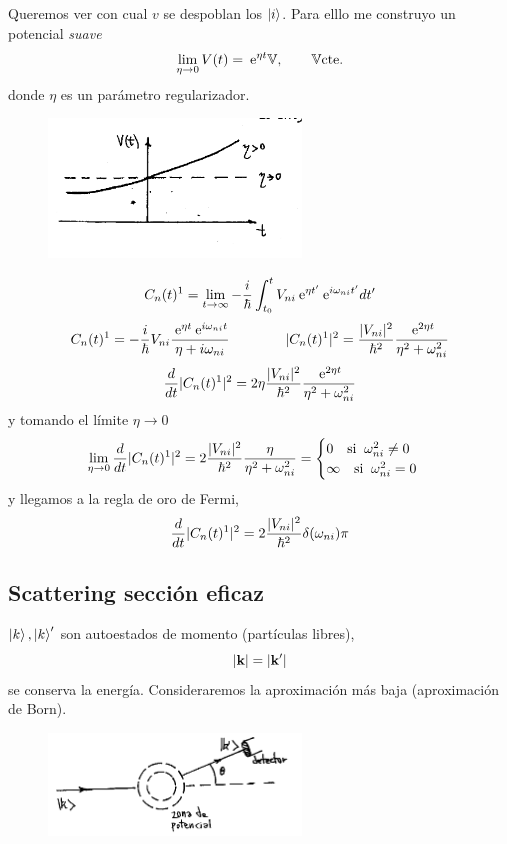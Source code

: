 \documentclass[10pt,oneside]{CBFT_book}
\begin{document}
Queremos ver con cual $v$ se despoblan los $\Ket{i}$. Para elllo me construyo un potencial {\it suave}
\[
	\lim_{\eta\to 0} V(t) = \:\mathrm{e}^{\eta t} \mathbb{V}, \qquad  \mathbb{V} \text{cte.}
\]
donde $\eta$ es un parámetro regularizador.
\begin{figure}[htb]
	\begin{center}
	\includegraphics[width=0.6\textwidth]{images/teo2_27.pdf}
	\end{center}
	\caption{}
\end{figure} 
\[
	C_n(t)^1 = \lim_{t\to\infty} -\frac{i}{\hbar} 
		\int_{t_0}^t V_{ni} \:\mathrm{e}^{\eta t'} \:\mathrm{e}^{i\omega_{ni} t'} dt'
\]
\[
	C_n(t)^1 = -\frac{i}{\hbar} V_{ni} \frac{\:\mathrm{e}^{\eta t} \:\mathrm{e}^{i\omega_{ni} t} }{\eta+i\omega_{ni}}
	\qquad \qquad 
 	|C_n(t)^1|^2 = \frac{|V_{ni}|^2}{\hbar^2} \frac{\:\mathrm{e}^{2\eta t} }{\eta^2 + \omega_{ni}^2 }
\]
\[
	\frac{d^{\hspace{-0.05em}} {}}{d {t}^{\hspace{-0.05em}}}|C_n(t)^1|^2 = 2 \eta \frac{|V_{ni}|^2}{\hbar^2} \frac{\:\mathrm{e}^{2\eta t} }{\eta^2 + \omega_{ni}^2 }
\]
y tomando el límite $\eta \to 0$ 
\[
	\lim_{\eta\to 0} \frac{d^{\hspace{-0.05em}} {}}{d {t}^{\hspace{-0.05em}}}|C_n(t)^1|^2 = 2 \frac{|V_{ni}|^2}{\hbar^2} 
			\frac{\eta }{\eta^2 + \omega_{ni}^2 } = \begin{cases}
	                    0 \quad \text{si}\;\; \omega_{ni}^2 \neq 0 \\
	                    \infty \quad \text{si}\;\; \omega_{ni}^2 = 0
	                   \end{cases}
\]
y llegamos a la regla de oro de Fermi,
\[
	\frac{d^{\hspace{-0.05em}} {}}{d {t}^{\hspace{-0.05em}}}|C_n(t)^1|^2 = 2 \frac{|V_{ni}|^2}{\hbar^2} \delta(\omega_{ni}) \pi
\]

\subsection{Scattering sección eficaz}

$\Ket{k},\Ket{k}'$ son autoestados de momento (partículas libres),
\[
	|\vb{k}| = |\vb{k}'| 
\]
se conserva la energía. Consideraremos la aproximación más baja (aproximación de Born).
\begin{figure}[htb]
	\begin{center}
	\includegraphics[width=0.6\textwidth]{images/teo2_28.pdf}
	\end{center}
	\caption{}
\end{figure} 
\end{document}
